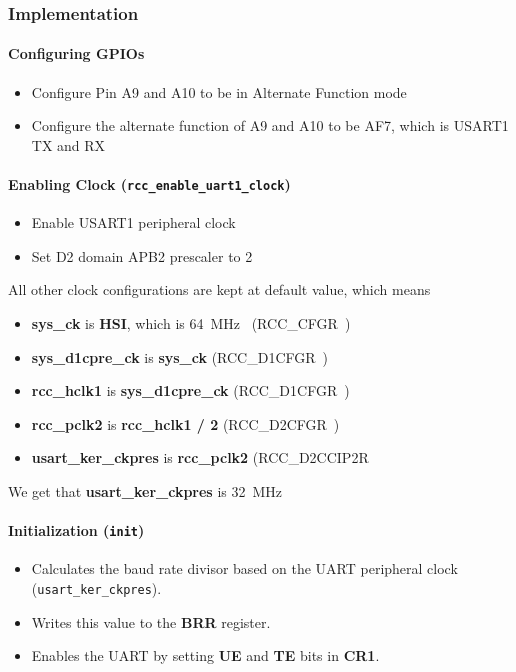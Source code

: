 \documentclass[12pt,a4paper]{article}
\begin{document}
\subsubsection{Implementation}

\paragraph{Configuring GPIOs}
\begin{itemize}
    \item Configure Pin A9 and A10 to be in Alternate Function mode
    \item Configure the alternate function of A9 and A10 to be AF7, which is USART1 TX and RX~\cite[pp.~88]{ref-manual}
\end{itemize}

\paragraph{Enabling Clock (\texttt{rcc\_enable\_uart1\_clock})}
\begin{itemize}
    \item Enable USART1 peripheral clock
    \item Set D2 domain APB2 prescaler to 2
\end{itemize}
All other clock configurations are kept at default value, which means
\begin{itemize}
    \item \textbf{sys\_ck} is \textbf{HSI}, which is \SI{64}{\mega\hertz}~\cite[pp.~1]{datasheet} (RCC\_CFGR~\cite[pp.~390]{ref-manual})
    \item \textbf{sys\_d1cpre\_ck} is \textbf{sys\_ck} (RCC\_D1CFGR~\cite[pp.~393-394]{ref-manual})
    \item \textbf{rcc\_hclk1} is \textbf{sys\_d1cpre\_ck} (RCC\_D1CFGR~\cite[pp.~393-394]{ref-manual})
    \item \textbf{rcc\_pclk2} is \textbf{rcc\_hclk1 / 2} (RCC\_D2CFGR~\cite[pp.~395]{ref-manual})
    \item \textbf{usart\_ker\_ckpres} is \textbf{rcc\_pclk2} (RCC\_D2CCIP2R~\cite[pp. 415-416]{ref-manual}
\end{itemize}
We get that \textbf{usart\_ker\_ckpres} is \SI{32}{\mega\hertz}

\paragraph{Initialization (\texttt{init})}
\begin{itemize}
    \item Calculates the baud rate divisor based on the UART peripheral clock (\texttt{usart\_ker\_ckpres}).
    \item Writes this value to the \textbf{BRR} register.
    \item Enables the UART by setting \textbf{UE} and \textbf{TE} bits in \textbf{CR1}.
\end{itemize}
\end{document}
